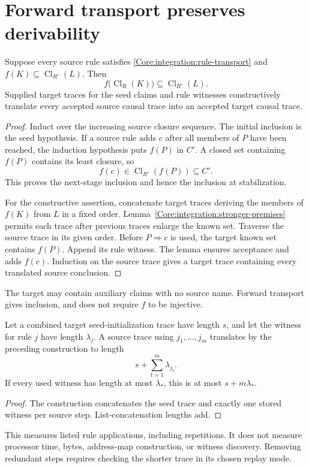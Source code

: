 \section{Forward transport preserves derivability}
\begin{Coretheorem}\label{Core:integration:forward-transport}
Suppose every source rule satisfies \eqref{Core:integration:rule-transport} and $f(K)\subseteq\operatorname{Cl}_{R'}(L)$. Then
\[
f\bigl(\operatorname{Cl}_{R}(K)\bigr)\subseteq\operatorname{Cl}_{R'}(L).
\]
Supplied target traces for the seed claims and rule witnesses constructively translate every accepted source causal trace into an accepted target causal trace.
\end{Coretheorem}
\begin{proof}
Induct over the increasing source closure sequence. The initial inclusion is the seed hypothesis. If a source rule adds $c$ after all members of $P$ have been reached, the induction hypothesis puts $f(P)$ in $C'$. A closed set containing $f(P)$ contains its least closure, so
\[
f(c)\in\operatorname{Cl}_{R'}(f(P))\subseteq C'.
\]
This proves the next-stage inclusion and hence the inclusion at stabilization.

For the constructive assertion, concatenate target traces deriving the members of $f(K)$ from $L$ in a fixed order. Lemma~\ref{Core:integration:stronger-premises} permits each trace after previous traces enlarge the known set. Traverse the source trace in its given order. Before $P\Rightarrow c$ is used, the target known set contains $f(P)$. Append its rule witness. The lemma ensures acceptance and adds $f(c)$. Induction on the source trace gives a target trace containing every translated source conclusion.
\end{proof}
The target may contain auxiliary claims with no source name. Forward transport gives inclusion, and does not require $f$ to be injective.

\begin{Corecorollary}
Let a combined target seed-initialization trace have length $s$, and let the witness for rule $j$ have length $\lambda_j$. A source trace using $j_1,\ldots,j_m$ translates by the preceding construction to length
\[
s+\sum_{t=1}^{m}\lambda_{j_t}.
\]
If every used witness has length at most $\lambda_*$, this is at most $s+m\lambda_*$.
\end{Corecorollary}
\begin{proof}
The construction concatenates the seed trace and exactly one stored witness per source step. List-concatenation lengths add.
\end{proof}
This measures listed rule applications, including repetitions. It does not measure processor time, bytes, address-map construction, or witness discovery. Removing redundant steps requires checking the shorter trace in its chosen replay mode.

